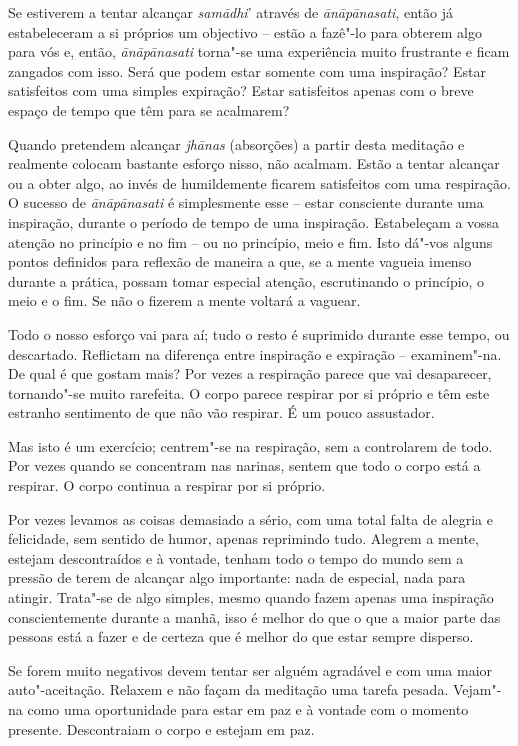 Se estiverem a tentar alcançar \emph{samādhi}' através de
\emph{ānāpānasati}, então já estabeleceram a si próprios um objectivo --
estão a fazê"-lo para obterem algo para vós e, então, \emph{ānāpānasati}
torna"-se uma experiência muito frustrante e ficam zangados com isso.
Será que podem estar somente com uma inspiração? Estar satisfeitos com uma
simples expiração? Estar satisfeitos apenas com o breve espaço de tempo
que têm para se acalmarem?

Quando pretendem alcançar \emph{jhānas} (absorções) a partir desta
meditação e realmente colocam bastante esforço nisso, não acalmam. Estão
a tentar alcançar ou a obter algo, ao invés de humildemente ficarem
satisfeitos com uma respiração. O sucesso de \emph{ānāpānasati} é
simplesmente esse -- estar consciente durante uma inspiração, durante o
período de tempo de uma inspiração. Estabeleçam a vossa atenção no
princípio e no fim -- ou no princípio, meio e fim. Isto dá"-vos alguns
pontos definidos para reflexão de maneira a que, se a mente vagueia
imenso durante a prática, possam tomar especial atenção, escrutinando o
princípio, o meio e o fim. Se não o fizerem a mente voltará a vaguear.

Todo o nosso esforço vai para aí; tudo o resto é suprimido durante esse
tempo, ou descartado. Reflictam na diferença entre inspiração e
expiração -- examinem"-na. De qual é que gostam mais? Por vezes a
respiração parece que vai desaparecer, tornando"-se muito rarefeita. O
corpo parece respirar por si próprio e têm este estranho sentimento de
que não vão respirar. É um pouco assustador.

Mas isto é um exercício; centrem"-se na respiração, sem a controlarem de
todo. Por vezes quando se concentram nas narinas, sentem que todo o
corpo está a respirar. O corpo continua a respirar por si próprio.

Por vezes levamos as coisas demasiado a sério, com uma total falta de
alegria e felicidade, sem sentido de humor, apenas
reprimindo tudo. Alegrem a mente, estejam descontraídos e à
vontade, tenham todo o tempo do mundo sem a pressão de terem de alcançar
algo importante: nada de especial, nada para atingir. Trata"-se de algo
simples, mesmo quando fazem apenas uma inspiração conscientemente
durante a manhã, isso é melhor do que o que a maior parte das pessoas
está a fazer e de certeza que é melhor do que estar sempre disperso.

Se forem muito negativos devem tentar ser alguém agradável e com uma
maior auto"-aceitação. Relaxem e não façam da meditação uma tarefa
pesada. Vejam"-na como uma oportunidade para estar em paz e à vontade com
o momento presente. Descontraiam o corpo e estejam em paz.

